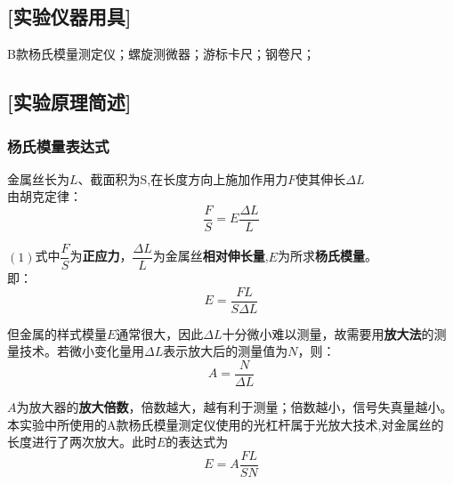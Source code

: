 \documentclass[UTF8]{article}
\begin{document}
	\subsection*{[实验仪器用具]}
	\par B款杨氏模量测定仪；螺旋测微器；游标卡尺；钢卷尺；
	\subsection*{[实验原理简述]}
	\subsubsection*{杨氏模量表达式}
	\par 金属丝长为$L$、截面积为S,在长度方向上施加作用力$F$使其伸长$\Delta L$\\
	 由胡克定律：
	 \begin{equation}
	 	\frac{F}{S}=E\frac{\Delta L}{L}
	 \end{equation}
	
	\par $(1)$式中$\dfrac{F}{S}$为\textbf{正应力}，$\dfrac{\Delta L}{L}$为金属丝\textbf{相对伸长量},$E$为所求\textbf{杨氏模量}。\\
	即：
	\begin{equation*}
	E=\frac{FL}{S\Delta L}
	\end{equation*}
	\par 但金属的样式模量$E$通常很大，因此$\Delta L$十分微小难以测量，故需要用\textbf{放大法}的测量技术。若微小变化量用$\Delta L$表示放大后的测量值为$N$，则：
	\begin{equation*}
		A=\frac{N}{\Delta L}
	\end{equation*}
	\par $A$为放大器的\textbf{放大倍数}，倍数越大，越有利于测量；倍数越小，信号失真量越小。本实验中所使用的A款杨氏模量测定仪使用的光杠杆属于光放大技术,对金属丝的长度进行了两次放大。此时$E$的表达式为
	\begin{equation}
		E=A\frac{FL}{SN}
	\end{equation}
	\clearpage
\end{document}
